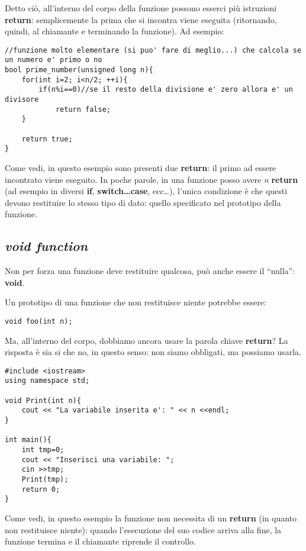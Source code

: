 Detto ciò, all'interno del corpo della funzione possono esserci più istruzioni \textbf{return}: semplicemente la prima che si incontra viene eseguita (ritornando, quindi, al chiamante e terminando la funzione). Ad esempio:
\begin{lstlisting}
//funzione molto elementare (si puo' fare di meglio...) che calcola se un numero e' primo o no
bool prime_number(unsigned long n){ 
	for(int i=2; i<n/2; ++i){
		if(n%i==0)//se il resto della divisione e' zero allora e' un divisore
			return false;  
	}

	return true;
}
\end{lstlisting}

Come vedi, in questo esempio sono presenti due \textbf{return}: il primo ad essere incontrato viene eseguito. In poche parole, in una funzione posso avere \emph{n} \textbf{return} (ad esempio in diversi \textbf{if}, \textbf{switch\ldots case}, ecc\ldots), l'unica condizione è che questi devono restituire lo stesso tipo di dato: quello specificato nel prototipo della funzione.

\subsection{\emph{void function}}
Non per forza una funzione deve restituire qualcosa, può anche essere il ``nulla'': \textbf{void}. 

Un prototipo di una funzione che non restituisce niente potrebbe essere:
\begin{lstlisting}
void foo(int n);
\end{lstlisting}

Ma, all'interno del corpo, dobbiamo ancora usare la parola chiave \textbf{return}? La risposta è sia si che no, in questo senso: non siamo obbligati, ma possiamo usarla. 

\begin{lstlisting}
#include <iostream>
using namespace std;

void Print(int n){
	cout << "La variabile inserita e': " << n <<endl;
}

int main(){
	int tmp=0;
	cout << "Inserisci una variabile: ";
	cin >>tmp;
	Print(tmp);
	return 0;
}
\end{lstlisting}

Come vedi, in questo esempio la funzione non necessita di un \textbf{return} (in quanto non restituisce niente): quando l'esecuzione del suo codice arriva alla fine, la funzione termina e il chiamante riprende il controllo.

